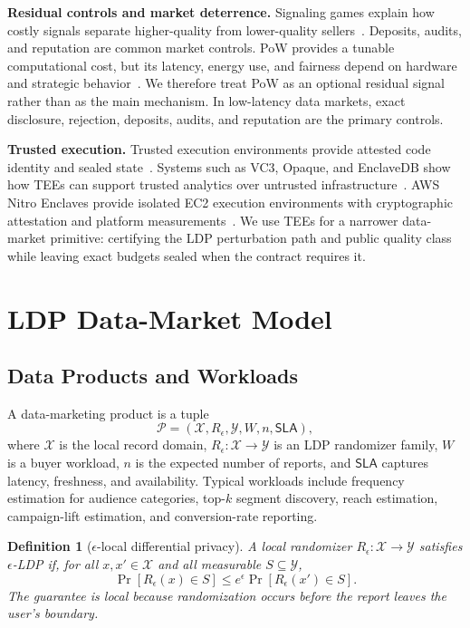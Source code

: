 \documentclass[conference]{IEEEtran}
\newtheorem{definition}{Definition}[section]
\newcommand{\eps}{\epsilon}
\begin{document}
\textbf{Residual controls and market deterrence.} Signaling games explain how costly signals separate higher-quality from lower-quality sellers~\cite{spence1973job}. Deposits, audits, and reputation are common market controls. PoW provides a tunable computational cost, but its latency, energy use, and fairness depend on hardware and strategic behavior~\cite{back2002hashcash,nakamoto2008bitcoin,kroll2013economics,eyal2014majority}. We therefore treat PoW as an optional residual signal rather than as the main mechanism. In low-latency data markets, exact disclosure, rejection, deposits, audits, and reputation are the primary controls.

\textbf{Trusted execution.} Trusted execution environments provide attested code identity and sealed state~\cite{costan2016intel}. Systems such as VC3, Opaque, and EnclaveDB show how TEEs can support trusted analytics over untrusted infrastructure~\cite{schuster2015vc3,zheng2017opaque,priebe2018enclavedb}. AWS Nitro Enclaves provide isolated EC2 execution environments with cryptographic attestation and platform measurements~\cite{awsnitro,awsattest}. We use TEEs for a narrower data-market primitive: certifying the LDP perturbation path and public quality class while leaving exact budgets sealed when the contract requires it.

\section{LDP Data-Market Model}
\label{sec:model}

\subsection{Data Products and Workloads}

A data-marketing product is a tuple
\[
\mathcal{P}=(\mathcal{X},R_\eps,\mathcal{Y},W,n,\mathsf{SLA}),
\]
where $\mathcal{X}$ is the local record domain, $R_\eps:\mathcal{X}\rightarrow\mathcal{Y}$ is an LDP randomizer family, $W$ is a buyer workload, $n$ is the expected number of reports, and $\mathsf{SLA}$ captures latency, freshness, and availability. Typical workloads include frequency estimation for audience categories, top-$k$ segment discovery, reach estimation, campaign-lift estimation, and conversion-rate reporting.

\begin{definition}[$\epsilon$-local differential privacy]
\label{def:ldp}
A local randomizer $R_\eps:\mathcal{X}\to\mathcal{Y}$ satisfies $\eps$-LDP if, for all $x,x'\in\mathcal{X}$ and all measurable $S\subseteq\mathcal{Y}$,
\[
\Pr[R_\eps(x)\in S]\le e^\eps\Pr[R_\eps(x')\in S].
\]
The guarantee is local because randomization occurs before the report leaves the user's boundary.
\end{definition}
\end{document}
